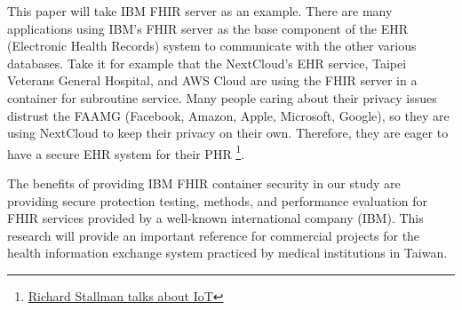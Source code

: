 This paper will take IBM FHIR server as an example. 
There are many applications using IBM's FHIR server as the base component of the EHR
(Electronic Health Records) system to communicate with the other various databases.
Take it for example that the NextCloud's EHR service, Taipei Veterans General Hospital,
and AWS Cloud are using the FHIR server in a container for subroutine service.
Many people caring about their privacy issues distrust the FAAMG (Facebook,
Amazon, Apple, Microsoft, Google), so they are using NextCloud to keep their privacy
on their own. Therefore, they are eager to have a secure EHR system for their
PHR
\footnote{\href{https://www.youtube.com/watch?v=AAP4N3KyLmM}{Richard Stallman talks about IoT}}.

The benefits of providing IBM FHIR container security in our study are providing
secure protection testing, methods, and performance evaluation for FHIR services provided by
a well-known international company (IBM). This research will provide an important reference for
commercial projects for the health information exchange system practiced by medical
institutions in Taiwan.
